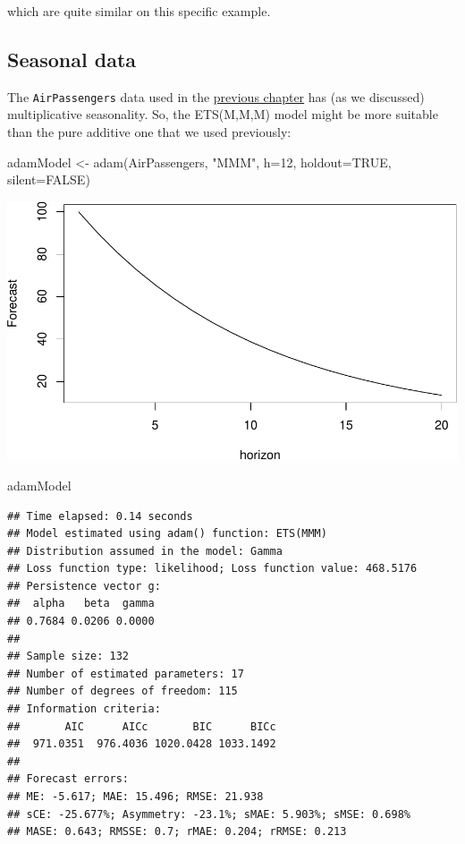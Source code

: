 \documentclass[
]{book}
\newenvironment{Shaded}{\begin{snugshade}}{\end{snugshade}}
\newcommand{\AttributeTok}[1]{\textcolor[rgb]{0.77,0.63,0.00}{#1}}
\newcommand{\ConstantTok}[1]{\textcolor[rgb]{0.00,0.00,0.00}{#1}}
\newcommand{\DecValTok}[1]{\textcolor[rgb]{0.00,0.00,0.81}{#1}}
\newcommand{\FunctionTok}[1]{\textcolor[rgb]{0.00,0.00,0.00}{#1}}
\newcommand{\NormalTok}[1]{#1}
\newcommand{\OtherTok}[1]{\textcolor[rgb]{0.56,0.35,0.01}{#1}}
\newcommand{\StringTok}[1]{\textcolor[rgb]{0.31,0.60,0.02}{#1}}
\theoremstyle{definition}
\theoremstyle{definition}
\theoremstyle{definition}
\theoremstyle{definition}
\theoremstyle{remark}
\begin{document}
which are quite similar on this specific example.

\hypertarget{seasonal-data}{%
\subsection{Seasonal data}\label{seasonal-data}}

The \texttt{AirPassengers} data used in the \protect\hyperlink{ADAMETSPureAdditiveExamples}{previous chapter} has (as we discussed) multiplicative seasonality. So, the ETS(M,M,M) model might be more suitable than the pure additive one that we used previously:

\begin{Shaded}
\begin{Highlighting}[]
\NormalTok{adamModel }\OtherTok{\textless{}{-}} \FunctionTok{adam}\NormalTok{(AirPassengers, }\StringTok{"MMM"}\NormalTok{, }\AttributeTok{h=}\DecValTok{12}\NormalTok{, }\AttributeTok{holdout=}\ConstantTok{TRUE}\NormalTok{,}
                  \AttributeTok{silent=}\ConstantTok{FALSE}\NormalTok{)}
\end{Highlighting}
\end{Shaded}

\includegraphics{adam_files/figure-latex/unnamed-chunk-39-1.pdf}

\begin{Shaded}
\begin{Highlighting}[]
\NormalTok{adamModel}
\end{Highlighting}
\end{Shaded}

\begin{verbatim}
## Time elapsed: 0.14 seconds
## Model estimated using adam() function: ETS(MMM)
## Distribution assumed in the model: Gamma
## Loss function type: likelihood; Loss function value: 468.5176
## Persistence vector g:
##  alpha   beta  gamma 
## 0.7684 0.0206 0.0000 
## 
## Sample size: 132
## Number of estimated parameters: 17
## Number of degrees of freedom: 115
## Information criteria:
##       AIC      AICc       BIC      BICc 
##  971.0351  976.4036 1020.0428 1033.1492 
## 
## Forecast errors:
## ME: -5.617; MAE: 15.496; RMSE: 21.938
## sCE: -25.677%; Asymmetry: -23.1%; sMAE: 5.903%; sMSE: 0.698%
## MASE: 0.643; RMSSE: 0.7; rMAE: 0.204; rRMSE: 0.213
\end{verbatim}
\end{document}
